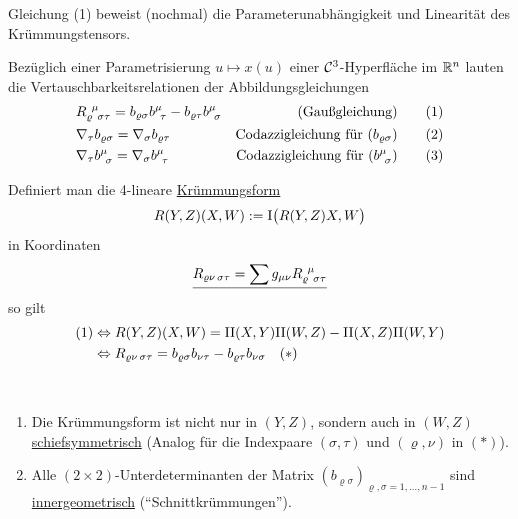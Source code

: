 \begin{bemerkung}
 Gleichung (1) beweist (nochmal) die Parameterunabhängigkeit und Linearität des Krümmungs\-tensors.
\end{bemerkung}
\setcounter{korollar}{1}
\begin{korollar}\label{korollar252}
 Bezüglich einer Parametrisierung \(u \mapsto x(u)\) einer \(\mathcal{C}^3\)-Hyperfläche im \(\mathbb{R}^n\) lauten die Vertauschbarkeitsrelationen der Abbildungsgleichungen
 \begin{align*}
  &R_{\varrho \;\, \sigma \tau}^{\;\, \mu} = b_{\varrho \sigma} b^{\mu}_{\;\, \tau} - b_{\varrho \tau} b^{\mu}_{\;\, \sigma} &\text{(Gaußgleichung)} \tag{1} \\
  &\nabla_\tau b_{\varrho \sigma} = \nabla_\sigma b_{\varrho \tau} &\text{Codazzigleichung für } (b_{\varrho \sigma}) \tag{2} \\
  &\nabla_\tau b^{\mu}_{\;\, \sigma} = \nabla_\sigma b^{\mu}_{\;\, \tau} &\text{Codazzigleichung für } (b^{\mu}_{\;\, \sigma}) \tag{3}
 \end{align*}
\end{korollar}

Definiert man die 4-lineare \uline{Krümmungsform}
\[
 R(Y,Z) (X,W) := \Rom1 \big(R(Y,Z)X, W\big)
\]
in Koordinaten
\[
 \uline{R_{\varrho \nu \,\sigma \tau} = \sum g_{\mu \nu} \riem \varrho \mu \sigma \tau}
\]
so gilt
\begin{align*}
 (1) &\Leftrightarrow R(Y,Z)(X,W) = \Rom2(X,Y) \Rom2(W,Z) - \Rom2(X,Z) \Rom2(W,Y) \\
 &\Leftrightarrow R_{\varrho \nu \,\sigma \tau} = b_{\varrho \sigma} b_{\nu \tau} - b_{\varrho \tau} b_{\nu \sigma} \quad (\ast)
\end{align*}

\begin{folgerung} \(\)
 \begin{enumerate}
  \item Die Krümmungsform ist nicht nur in \((Y,Z)\), sondern auch in \((W,Z)\) \uline{schiefsymmetrisch} \big(Analog für die Indexpaare \((\sigma, \tau)\) und \((\varrho, \nu)\) in \((\ast)\)\big).
  \item Alle \((2 \times 2)\)-Unterdeterminanten der Matrix \((b_{\varrho \sigma})_{\varrho, \sigma = 1, \dots, n-1}\) sind \uline{innergeometrisch} (``Schnittkrümmungen'').
 \end{enumerate}
\end{folgerung}

